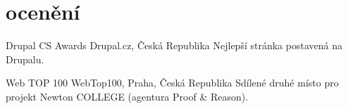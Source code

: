\documentclass[]{friggeri-cv} %
\begin{document}

\section{ocenění}

\begin{entrylist}
\entry
{\parbox[t]{2cm}{}}
{Drupal CS Awards}
{Drupal.cz, Česká Republika}
{Nejlepší stránka postavená na Drupalu.}
\entry
{\parbox[t]{2cm}{}}
{Web TOP 100}
{WebTop100, Praha, Česká Republika}
{Sdílené druhé místo pro projekt Newton COLLEGE (agentura Proof \& Reason).}
\end{entrylist}
\end{document}
